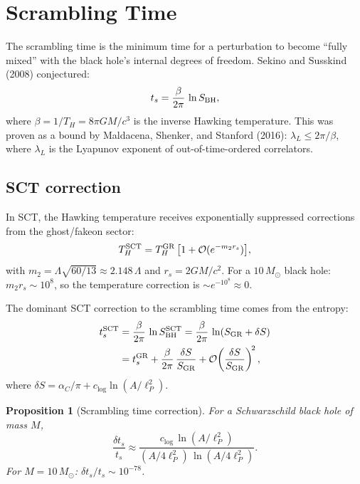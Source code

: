\documentclass[11pt,a4paper]{article}
\renewcommand{\order}{\mathcal{O}}
\theoremstyle{plain}
\newtheorem{proposition}[theorem]{Proposition}
\theoremstyle{definition}
\begin{document}
\section{Scrambling Time}
\label{sec:scrambling}

The scrambling time is the minimum time for a perturbation to become
``fully mixed'' with the black hole's internal degrees of freedom.
Sekino and Susskind (2008) conjectured:
\begin{equation}
\label{eq:scrambling-gr}
t_s = \frac{\beta}{2\pi}\,\ln S_{\rm BH},
\end{equation}
where $\beta = 1/T_H = 8\pi G M / c^3$ is the inverse Hawking temperature.
This was proven as a bound by Maldacena, Shenker, and Stanford (2016):
$\lambda_L \leq 2\pi / \beta$, where $\lambda_L$ is the Lyapunov exponent
of out-of-time-ordered correlators.

\subsection{SCT correction}

In SCT, the Hawking temperature receives exponentially suppressed
corrections from the ghost/fakeon sector:
\begin{equation}
T_H^{\rm SCT} = T_H^{\rm GR}\,\bigl[1 + \order(e^{-m_2 r_s})\bigr],
\end{equation}
with $m_2 = \Lambda\sqrt{60/13} \approx 2.148\,\Lambda$ and $r_s = 2GM/c^2$.
For a $10\,M_\odot$ black hole: $m_2 r_s \sim 10^8$, so the temperature
correction is $\sim e^{-10^8} \approx 0$.

The dominant SCT correction to the scrambling time comes from the entropy:
\begin{align}
t_s^{\rm SCT} &= \frac{\beta}{2\pi}\,\ln S_{\rm BH}^{\rm SCT}
               = \frac{\beta}{2\pi}\,\ln\!\left(S_{\rm GR} + \delta S\right) \\
              &= t_s^{\rm GR} + \frac{\beta}{2\pi}\,\frac{\delta S}{S_{\rm GR}}
                 + \order\!\left(\frac{\delta S}{S_{\rm GR}}\right)^{\!2},
\end{align}
where $\delta S = \alpha_C/\pi + c_{\log}\ln(A/\ell_P^2)$.

\begin{proposition}[Scrambling time correction]
\label{prop:scrambling}
For a Schwarzschild black hole of mass $M$,
\begin{equation}
\frac{\delta t_s}{t_s}
  \approx \frac{c_{\log}\,\ln(A/\ell_P^2)}{(A/4\ell_P^2)\,\ln(A/4\ell_P^2)}.
\end{equation}
For $M = 10\,M_\odot$: $\delta t_s/t_s \sim 10^{-78}$.
\end{proposition}
\end{document}
